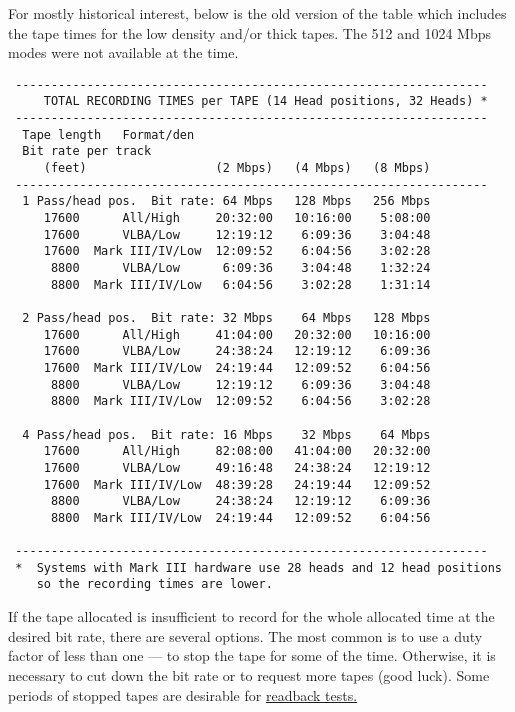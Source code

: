 \documentclass{report}
\begin{document}
For mostly historical interest, below is the old version of the
table which includes the tape times for the low density and/or
thick tapes.  The 512 and 1024 Mbps modes were not available
at the time.

\begin{verbatim}
 ------------------------------------------------------------------
     TOTAL RECORDING TIMES per TAPE (14 Head positions, 32 Heads) *
 ------------------------------------------------------------------
  Tape length   Format/den
  Bit rate per track
     (feet)                  (2 Mbps)   (4 Mbps)   (8 Mbps)
 ------------------------------------------------------------------
  1 Pass/head pos.  Bit rate: 64 Mbps   128 Mbps   256 Mbps
     17600      All/High     20:32:00   10:16:00    5:08:00
     17600      VLBA/Low     12:19:12    6:09:36    3:04:48
     17600  Mark III/IV/Low  12:09:52    6:04:56    3:02:28
      8800      VLBA/Low      6:09:36    3:04:48    1:32:24
      8800  Mark III/IV/Low   6:04:56    3:02:28    1:31:14

  2 Pass/head pos.  Bit rate: 32 Mbps    64 Mbps   128 Mbps
     17600      All/High     41:04:00   20:32:00   10:16:00
     17600      VLBA/Low     24:38:24   12:19:12    6:09:36
     17600  Mark III/IV/Low  24:19:44   12:09:52    6:04:56
      8800      VLBA/Low     12:19:12    6:09:36    3:04:48
      8800  Mark III/IV/Low  12:09:52    6:04:56    3:02:28

  4 Pass/head pos.  Bit rate: 16 Mbps    32 Mbps    64 Mbps
     17600      All/High     82:08:00   41:04:00   20:32:00
     17600      VLBA/Low     49:16:48   24:38:24   12:19:12
     17600  Mark III/IV/Low  48:39:28   24:19:44   12:09:52
      8800      VLBA/Low     24:38:24   12:19:12    6:09:36
      8800  Mark III/IV/Low  24:19:44   12:09:52    6:04:56

 ------------------------------------------------------------------
 *  Systems with Mark III hardware use 28 heads and 12 head positions
    so the recording times are lower.

\end{verbatim}

If the tape allocated is insufficient to record for the whole allocated
time at the desired bit rate, there are several options.  The most
common is to use a duty factor of less than one --- to stop the tape
for some of the time.  Otherwise, it is necessary to cut down the
bit rate or to request more tapes (good luck).  Some periods of stopped
tapes are desirable for 
{\hyperref[SSSEC:READBACK]{readback tests.}}
\end{document}
